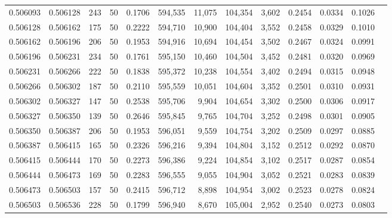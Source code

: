 \begin{tabular}{rrrrrrrrrrrrr}
0.506093 & 0.506128 & 243 &  50 &                                     0.1706 & 594,535 &  11,075 & 104,354 &   3,602 & 0.2454 & 0.0334 & 0.1026 \\
0.506128 & 0.506162 & 175 &  50 &                                     0.2222 & 594,710 &  10,900 & 104,404 &   3,552 & 0.2458 & 0.0329 & 0.1010 \\
0.506162 & 0.506196 & 206 &  50 &                                     0.1953 & 594,916 &  10,694 & 104,454 &   3,502 & 0.2467 & 0.0324 & 0.0991 \\
0.506196 & 0.506231 & 234 &  50 &                                     0.1761 & 595,150 &  10,460 & 104,504 &   3,452 & 0.2481 & 0.0320 & 0.0969 \\
0.506231 & 0.506266 & 222 &  50 &                                     0.1838 & 595,372 &  10,238 & 104,554 &   3,402 & 0.2494 & 0.0315 & 0.0948 \\
0.506266 & 0.506302 & 187 &  50 &                                     0.2110 & 595,559 &  10,051 & 104,604 &   3,352 & 0.2501 & 0.0310 & 0.0931 \\
0.506302 & 0.506327 & 147 &  50 &                                     0.2538 & 595,706 &   9,904 & 104,654 &   3,302 & 0.2500 & 0.0306 & 0.0917 \\
0.506327 & 0.506350 & 139 &  50 &                                     0.2646 & 595,845 &   9,765 & 104,704 &   3,252 & 0.2498 & 0.0301 & 0.0905 \\
0.506350 & 0.506387 & 206 &  50 &                                     0.1953 & 596,051 &   9,559 & 104,754 &   3,202 & 0.2509 & 0.0297 & 0.0885 \\
0.506387 & 0.506415 & 165 &  50 &                                     0.2326 & 596,216 &   9,394 & 104,804 &   3,152 & 0.2512 & 0.0292 & 0.0870 \\
0.506415 & 0.506444 & 170 &  50 &                                     0.2273 & 596,386 &   9,224 & 104,854 &   3,102 & 0.2517 & 0.0287 & 0.0854 \\
0.506444 & 0.506473 & 169 &  50 &                                     0.2283 & 596,555 &   9,055 & 104,904 &   3,052 & 0.2521 & 0.0283 & 0.0839 \\
0.506473 & 0.506503 & 157 &  50 &                                     0.2415 & 596,712 &   8,898 & 104,954 &   3,002 & 0.2523 & 0.0278 & 0.0824 \\
0.506503 & 0.506536 & 228 &  50 &                                     0.1799 & 596,940 &   8,670 & 105,004 &   2,952 & 0.2540 & 0.0273 & 0.0803 \\

\end{tabular}
